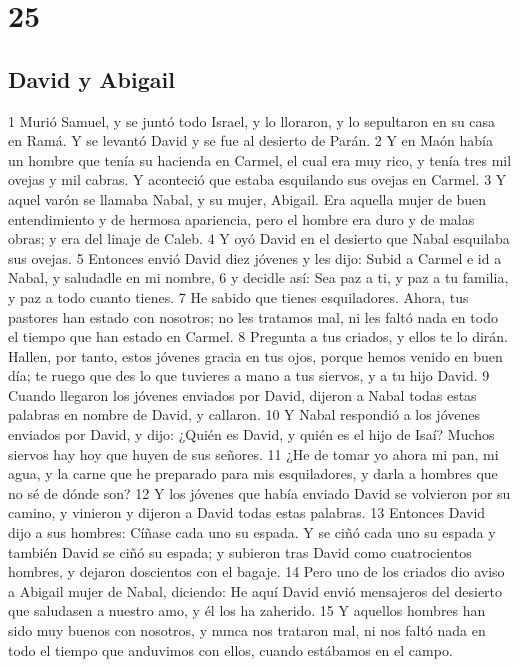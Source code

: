 \chapter{25}

\section*{David y Abigail}


1 Murió Samuel, y se juntó todo Israel, y lo lloraron, y lo sepultaron en su casa en Ramá. Y se levantó David y se fue al desierto de Parán.
2 Y en Maón había un hombre que tenía su hacienda en Carmel, el cual era muy rico, y tenía tres mil ovejas y mil cabras. Y aconteció que estaba esquilando sus ovejas en Carmel.
3 Y aquel varón se llamaba Nabal, y su mujer, Abigail. Era aquella mujer de buen entendimiento y de hermosa apariencia, pero el hombre era duro y de malas obras; y era del linaje de Caleb.
4 Y oyó David en el desierto que Nabal esquilaba sus ovejas.
5 Entonces envió David diez jóvenes y les dijo: Subid a Carmel e id a Nabal, y saludadle en mi nombre,
6 y decidle así: Sea paz a ti, y paz a tu familia, y paz a todo cuanto tienes.
7 He sabido que tienes esquiladores. Ahora, tus pastores han estado con nosotros; no les tratamos mal, ni les faltó nada en todo el tiempo que han estado en Carmel.
8 Pregunta a tus criados, y ellos te lo dirán. Hallen, por tanto, estos jóvenes gracia en tus ojos, porque hemos venido en buen día; te ruego que des lo que tuvieres a mano a tus siervos, y a tu hijo David.
9 Cuando llegaron los jóvenes enviados por David, dijeron a Nabal todas estas palabras en nombre de David, y callaron.
10 Y Nabal respondió a los jóvenes enviados por David, y dijo: ¿Quién es David, y quién es el hijo de Isaí? Muchos siervos hay hoy que huyen de sus señores.
11 ¿He de tomar yo ahora mi pan, mi agua, y la carne que he preparado para mis esquiladores, y darla a hombres que no sé de dónde son?
12 Y los jóvenes que había enviado David se volvieron por su camino, y vinieron y dijeron a David todas estas palabras.
13 Entonces David dijo a sus hombres: Cíñase cada uno su espada. Y se ciñó cada uno su espada y también David se ciñó su espada; y subieron tras David como cuatrocientos hombres, y dejaron doscientos con el bagaje.
14 Pero uno de los criados dio aviso a Abigail mujer de Nabal, diciendo: He aquí David envió mensajeros del desierto que saludasen a nuestro amo, y él los ha zaherido.
15 Y aquellos hombres han sido muy buenos con nosotros, y nunca nos trataron mal, ni nos faltó nada en todo el tiempo que anduvimos con ellos, cuando estábamos en el campo.
